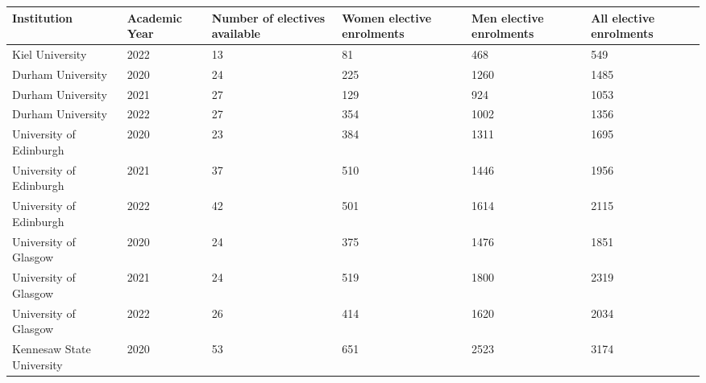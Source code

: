 \begin{tabular}{llp{1.6cm}p{1.6cm}p{1.6cm}p{1.6cm}}
\toprule
                    Institution &  Academic Year &  Number of electives available &  Women elective enrolments &  Men elective enrolments &  All elective enrolments \\
\midrule
                Kiel University &           2022 &                             13 &                         81 &                      468 &                      549 \\
              Durham University &           2020 &                             24 &                        225 &                     1260 &                     1485 \\
              Durham University &           2021 &                             27 &                        129 &                      924 &                     1053 \\
              Durham University &           2022 &                             27 &                        354 &                     1002 &                     1356 \\
        University of Edinburgh &           2020 &                             23 &                        384 &                     1311 &                     1695 \\
        University of Edinburgh &           2021 &                             37 &                        510 &                     1446 &                     1956 \\
        University of Edinburgh &           2022 &                             42 &                        501 &                     1614 &                     2115 \\
          University of Glasgow &           2020 &                             24 &                        375 &                     1476 &                     1851 \\
          University of Glasgow &           2021 &                             24 &                        519 &                     1800 &                     2319 \\
          University of Glasgow &           2022 &                             26 &                        414 &                     1620 &                     2034 \\
      Kennesaw State University &           2020 &                             53 &                        651 &                     2523 &                     3174 \\

\end{tabular}

